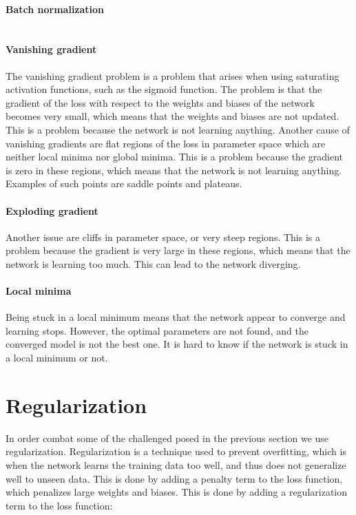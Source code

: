         \paragraph{Batch normalization}


    \section{}

        \paragraph{Vanishing gradient}
            The vanishing gradient problem is a problem that arises when using saturating activation functions, such as the sigmoid function. The problem is that the gradient of the loss with respect to the weights and biases of the network becomes very small, which means that the weights and biases are not updated. This is a problem because the network is not learning anything. Another cause of vanishing gradients are flat regions of the loss in parameter space which are neither local minima nor global minima. This is a problem because the gradient is zero in these regions, which means that the network is not learning anything. Examples of such points are saddle points and plateaus. 

        \paragraph{Exploding gradient}
            Another issue are cliffs in parameter space, or very steep regions. This is a problem because the gradient is very large in these regions, which means that the network is learning too much. This can lead to the network diverging.

        \paragraph{Local minima}
            Being stuck in a local minimum means that the network appear to converge and learning stops. However, the optimal parameters are not found, and the converged model is not the best one. It is hard to know if the network is stuck in a local minimum or not.

\section{Regularization}
    In order combat some of the challenged posed in the previous section we use regularization. Regularization is a technique used to prevent overfitting, which is when the network learns the training data too well, and thus does not generalize well to unseen data. This is done by adding a penalty term to the loss function, which penalizes large weights and biases. This is done by adding a regularization term to the loss function:

